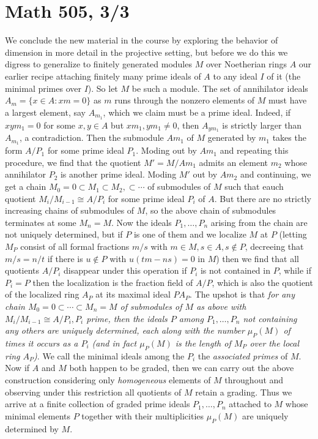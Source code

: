 \documentclass[10pt]{article}
\begin{document}
\section*{Math 505, 3/3}

We conclude the new material in the course by exploring the behavior of
dimension in more detail in the projective setting, but before we do
this we digress to generalize to finitely generated modules $M$ over
Noetherian rings $A$ our earlier recipe attaching finitely many prime
ideals of $A$ to any ideal $I$ of it (the minimal primes over $I$). So
let $M$ be such a module. The set of annihilator ideals $A_m = \{x\in A:
xm = 0\}$ as $m$ runs through the nonzero elements of $M$ must have a
largest element, say $A_{m_1}$, which we claim must be a prime ideal.
Indeed, if $xym_1=0$ for some $x,y\in A$ but $xm_1,ym_1\ne0$, then
$A_{ym_1}$ is strictly larger than $A_{m_1}$, a contradiction. Then the
submodule $Am_1$ of $M$ generated by $m_1$ takes the form $A/P_1$ for
some prime ideal $P_1$. Moding out by $Am_1$ and repeating this
procedure, we find that the quotient $M'=M/Am_1$ admits an element $m_2$
whose annihilator $P_2$ is another prime ideal. Moding $M'$ out by
$Am_2$ and continuing, we get a chain $M_0=0\subset M_1\subset
M_2,\subset\cdots$ of submodules of $M$ such that eauch quotient
$M_i/M_{i-1}\cong A/P_i$ for some prime ideal $P_i$ of $A$. But there
are no strictly increasing chains of submodules of $M$, so the above
chain of submodules terminates at some $M_n = M$. Now the ideals
$P_1,\ldots,P_n$ arising from the chain are not uniquely determined, but
if $P$ is one of them and we localize $M$ at $P$ (letting $M_P$ consist
of all formal fractions $m/s$ with $m\in M,s\in A,s\notin P$, decreeing
that $m/s = n/t$ if there is $u\notin P $ with $u(tm - ns) = 0$ in $M$)
then we find that all quotients $A/P_i$ disappear under this operation
if $P_i$ is not contained in $P$, while if $P_i = P$ then the
localization is the fraction field of $A/P$, which is also the quotient
of the localized ring $A_P$ at its maximal ideal $PA_P$. The upshot is
that {\sl for any chain $M_0 = 0\subset\cdots\subset M_n= M$ of
  submodules of $M$ as above with $M_i/M_{i-1}\cong A/P_i, P_i$ prime,
  then the ideals $P$ among $P_1,\ldots,P_n$ not containing any others
  are uniquely determined, each along with the number $\mu_P(M)$ of
  times it occurs as a $P_i$ (and in fact $\mu_P(M)$ is the length of
  $M_P$ over the local ring $A_P$)}. We call the minimal ideals among
the $P_i$ the {\sl associated primes} of $M$. Now if $A$ and $M$ both
happen to be graded, then we can carry out the above construction
considering only {\sl homogeneous} elements of $M$ throughout and
observing under this restriction all quotients of $M$ retain a grading.
Thus we arrive at a finite collection of graded prime ideals
$P_1,\ldots,P_n$ attached to $M$ whose minimal elements $P$ together
with their multiplicities $\mu_P(M)$ are uniquely determined by $M$.
\end{document}
